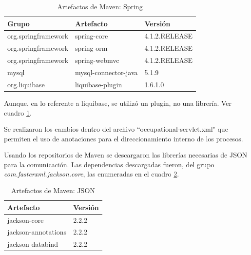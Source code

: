     \begin{table}[h!]
        
        \begin{center}
            \begin{tabular}{|l|l|l|}\hline
                Grupo & Artefacto & Versión \\\hline
                org.springframework & spring-core & 4.1.2.RELEASE \\\hline
                org.springframework & spring-orm & 4.1.2.RELEASE \\\hline
                org.springframework & spring-webmvc & 4.1.2.RELEASE \\\hline
                mysql & mysql-connector-java & 5.1.9 \\\hline
                org.liquibase & liquibase-plugin & 1.6.1.0 \\\hline
            \end{tabular}
        \end{center}
        
        \caption{Artefactos de Maven: Spring}
        \label{artefactos-spring}
    \end{table}
    
    Aunque, en lo referente a liquibase, se utilizó un plugin, no una librería. Ver cuadro \ref{artefactos-spring}.
    
    Se realizaron los cambios dentro del archivo ``occupational-servlet.xml" que permiten el uso de anotaciones para el direccionamiento interno de los procesos.
    
    Usando los repositorios de Maven se descargaron las librerías necesarias de JSON para la comunicación. Las dependencias descargadas fueron, del grupo \textit{com.fasterxml.jackson.core}, las enumeradas en el cuadro \ref{artefactos-json}.
     
    \begin{table}[h!]
         
        \begin{center}
            \begin{tabular}{|l|l|}\hline
                Artefacto & Versión \\\hline
                jackson-core & 2.2.2 \\\hline
                jackson-annotations & 2.2.2 \\\hline
                jackson-databind & 2.2.2 \\\hline                   
            \end{tabular}
        \end{center}
        
        \caption{Artefactos de Maven: JSON}
        \label{artefactos-json}
    \end{table}
    
